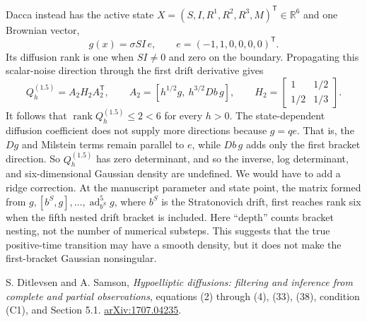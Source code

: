 \documentclass[10pt]{article}
\newcommand{\R}{\mathbb R}
\newcommand{\rank}{\operatorname{rank}}
\begin{document}
Dacca instead has the active state
$X=(S,I,R^1,R^2,R^3,M)^\mathsf T\in\R^6$ and one Brownian vector,
\[
 g(x)=\sigma SI\,e,\qquad e=(-1,1,0,0,0,0)^\mathsf T.
\]
Its diffusion rank is one when $SI\ne0$ and zero on the boundary.  Propagating
this scalar-noise direction through the first drift derivative gives
\[
 Q_h^{(1.5)}=A_2H_2A_2^\mathsf T,\qquad
 A_2=[h^{1/2}g,\ h^{3/2}Db\,g],\qquad
 H_2=\begin{bmatrix}1&1/2\\1/2&1/3\end{bmatrix}.
\]
It follows that $\rank Q_h^{(1.5)}\le2<6$ for every $h>0$.  The
state-dependent diffusion coefficient does not supply more directions because
$g=q e$. That is, the $Dg$ and Milstein terms remain parallel to $e$, while $Db\,g$
adds only the first bracket direction.  So $Q_h^{(1.5)}$ has zero
determinant, and so the inverse, log determinant, and six-dimensional
Gaussian density are undefined. We would have to add a ridge correction.  
At the manuscript parameter and state point, the matrix formed from
$g,[b^S,g],\ldots,\operatorname{ad}_{b^S}^{5}g$, where $b^S$ is the
Stratonovich drift, first reaches rank six when the fifth nested drift bracket
is included.  Here ``depth'' counts bracket nesting, not the number of numerical
substeps.  This suggests that the true positive-time transition may have a
smooth density, but it does not make the first-bracket Gaussian nonsingular.

{\footnotesize
S. Ditlevsen and A. Samson, \emph{Hypoelliptic diffusions: filtering and
inference from complete and partial observations}, equations (2) through (4), (33),
(38), condition (C1), and Section 5.1.
\href{https://arxiv.org/abs/1707.04235}{arXiv:1707.04235}.}
\end{document}
